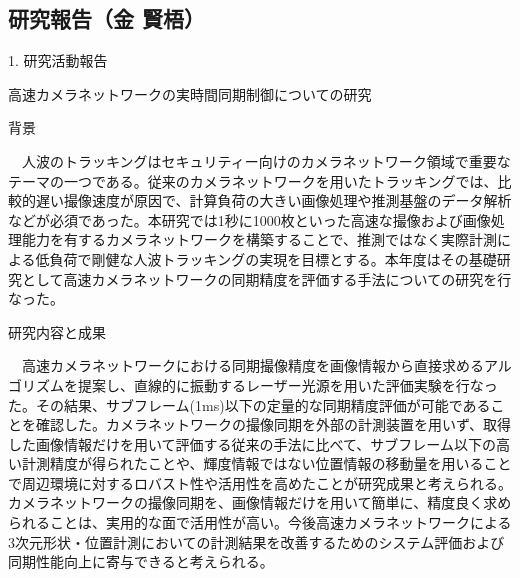 \subsection{研究報告（金 賢梧）}

1. 研究活動報告

高速カメラネットワークの実時間同期制御についての研究

背景

　人波のトラッキングはセキュリティー向けのカメラネットワーク領域で重要なテーマの一つである。従来のカメラネットワークを用いたトラッキングでは、比較的遅い撮像速度が原因で、計算負荷の大きい画像処理や推測基盤のデータ解析などが必須であった。本研究では1秒に1000枚といった高速な撮像および画像処理能力を有するカメラネットワークを構築することで、推測ではなく実際計測による低負荷で剛健な人波トラッキングの実現を目標とする。本年度はその基礎研究として高速カメラネットワークの同期精度を評価する手法についての研究を行なった。

研究内容と成果

　高速カメラネットワークにおける同期撮像精度を画像情報から直接求めるアルゴリズムを提案し、直線的に振動するレーザー光源を用いた評価実験を行なった。その結果、サブフレーム(1ms)以下の定量的な同期精度評価が可能であることを確認した。カメラネットワークの撮像同期を外部の計測装置を用いず、取得した画像情報だけを用いて評価する従来の手法に比べて、サブフレーム以下の高い計測精度が得られたことや、輝度情報ではない位置情報の移動量を用いることで周辺環境に対するロバスト性や活用性を高めたことが研究成果と考えられる。カメラネットワークの撮像同期を、画像情報だけを用いて簡単に、精度良く求められることは、実用的な面で活用性が高い。今後高速カメラネットワークによる3次元形状・位置計測においての計測結果を改善するためのシステム評価および同期性能向上に寄与できると考えられる。
